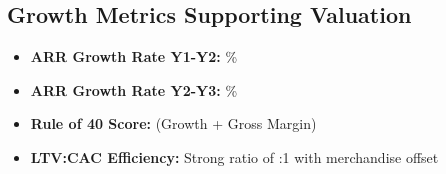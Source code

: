 \subsection{Growth Metrics Supporting Valuation}
\begin{itemize}
    \item \textbf{ARR Growth Rate Y1-Y2:} \%
    \item \textbf{ARR Growth Rate Y2-Y3:} \%
    \item \textbf{Rule of 40 Score:}  (Growth + Gross Margin)
    \item \textbf{LTV:CAC Efficiency:} Strong ratio of \numint{\subLTV/(\cacDigital - \merchOffsetSubsCalc)}:1 with merchandise offset
\end{itemize}
